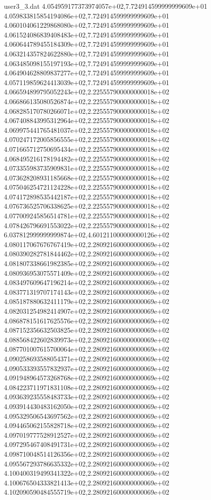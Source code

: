 \begin{filecontents}{user3_3.dat}
4.054959177373974057e+02,7.724914599999999609e+01
4.059833815854194086e+02,7.724914599999999609e+01
4.060104061229868080e+02,7.724914599999999609e+01
4.061524086839408483e+02,7.724914599999999609e+01
4.060644789455184309e+02,7.724914599999999609e+01
4.063214357824622880e+02,7.724914599999999609e+01
4.063485098155197193e+02,7.724914599999999609e+01
4.064904628809837277e+02,7.724914599999999609e+01
4.057119859624413039e+02,7.724914599999999609e+01
4.066594899795052243e+02,2.225557900000000018e+02
4.066866135080526874e+02,2.225557900000000018e+02
4.068285170780266071e+02,2.225557900000000018e+02
4.067408843995312964e+02,2.225557900000000018e+02
4.069975441765481037e+02,2.225557900000000018e+02
4.070247172005856555e+02,2.225557900000000018e+02
4.071665712750695434e+02,2.225557900000000018e+02
4.068495216178194482e+02,2.225557900000000018e+02
4.073355983735909831e+02,2.225557900000000018e+02
4.073628208931185668e+02,2.225557900000000018e+02
4.075046254721124228e+02,2.225557900000000018e+02
4.074172898535442187e+02,2.225557900000000018e+02
4.076736525706338625e+02,2.225557900000000018e+02
4.077009245856514781e+02,2.225557900000000018e+02
4.078426796691553022e+02,2.225557900000000018e+02
6.037812999999999874e+02,4.601211000000000126e+02
4.080117067676767419e+02,2.280921600000000069e+02
4.080390282781844462e+02,2.280921600000000069e+02
4.081807338661982385e+02,2.280921600000000069e+02
4.080936953075571409e+02,2.280921600000000069e+02
4.083497609647196214e+02,2.280921600000000069e+02
4.083771319707174143e+02,2.280921600000000069e+02
4.085187880632411179e+02,2.280921600000000069e+02
4.082031254982414907e+02,2.280921600000000069e+02
4.086878151617625576e+02,2.280921600000000069e+02
4.087152356632503825e+02,2.280921600000000069e+02
4.088568422602839973e+02,2.280921600000000069e+02
4.087701007615700064e+02,2.280921600000000069e+02
4.090258693588054371e+02,2.280921600000000069e+02
4.090533393557832937e+02,2.280921600000000069e+02
4.091948964573268768e+02,2.280921600000000069e+02
4.084223711971831108e+02,2.280921600000000069e+02
4.093639235558483733e+02,2.280921600000000069e+02
4.093914430483162050e+02,2.280921600000000069e+02
4.095329506543697562e+02,2.280921600000000069e+02
4.094465062155828718e+02,2.280921600000000069e+02
4.097019777528912527e+02,2.280921600000000069e+02
4.097295467408491731e+02,2.280921600000000069e+02
4.098710048514126356e+02,2.280921600000000069e+02
4.095567293786635332e+02,2.280921600000000069e+02
4.100400319499341322e+02,2.280921600000000069e+02
4.100676504333821413e+02,2.280921600000000069e+02
4.102090590484555719e+02,2.280921600000000069e+02

\end{filecontents}
